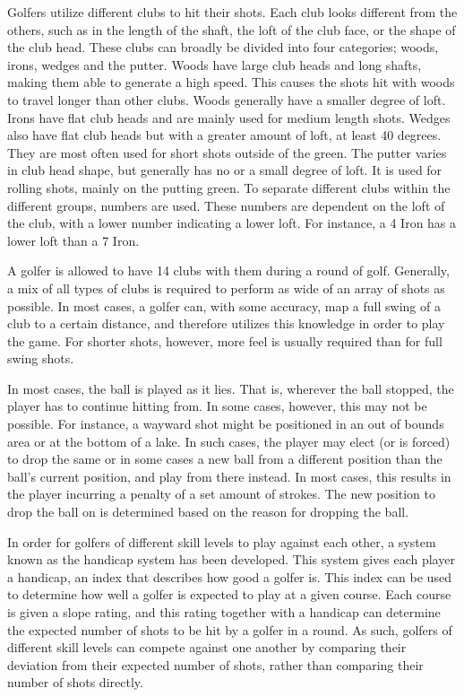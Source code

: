 \documentclass{kththesis}
\begin{document}
Golfers utilize different clubs to hit their shots. Each club looks different from the others, such as in the length of the shaft, the loft of the club face, or the shape of the club head. These clubs can broadly be divided into four categories; woods, irons, wedges and the putter. Woods have large club heads and long shafts, making them able to generate a high speed. This causes the shots hit with woods to travel longer than other clubs. Woods generally have a smaller degree of loft. Irons have flat club heads and are mainly used for medium length shots. Wedges also have flat club heads but with a greater amount of loft, at least 40 degrees. They are most often used for short shots outside of the green. The putter varies in club head shape, but generally has no or a small degree of loft. It is used for rolling shots, mainly on the putting green. To separate different clubs within the different groups, numbers are used. These numbers are dependent on the loft of the club, with a lower number indicating a lower loft. For instance, a 4 Iron has a lower loft than a 7 Iron.

A golfer is allowed to have 14 clubs with them during a round of golf. Generally, a mix of all types of clubs is required to perform as wide of an array of shots as possible. In most cases, a golfer can, with some accuracy, map a full swing of a club to a certain distance, and therefore utilizes this knowledge in order to play the game. For shorter shots, however, more feel is usually required than for full swing shots.

In most cases, the ball is played as it lies. That is, wherever the ball stopped, the player has to continue hitting from. In some cases, however, this may not be possible. For instance, a wayward shot might be positioned in an out of bounds area or at the bottom of a lake. In such cases, the player may elect (or is forced) to drop the same or in some cases a new ball from a different position than the ball's current position, and play from there instead. In most cases, this results in the player incurring a penalty of a set amount of strokes. The new position to drop the ball on is determined based on the reason for dropping the ball. 

In order for golfers of different skill levels to play against each other, a system known as the handicap system has been developed. This system gives each player a handicap, an index that describes how good a golfer is. This index can be used to determine how well a golfer is expected to play at a given course. Each course is given a slope rating, and this rating together with a handicap can determine the expected number of shots to be hit by a golfer in a round. As such, golfers of different skill levels can compete against one another by comparing their deviation from their expected number of shots, rather than comparing their number of shots directly.
\end{document}
